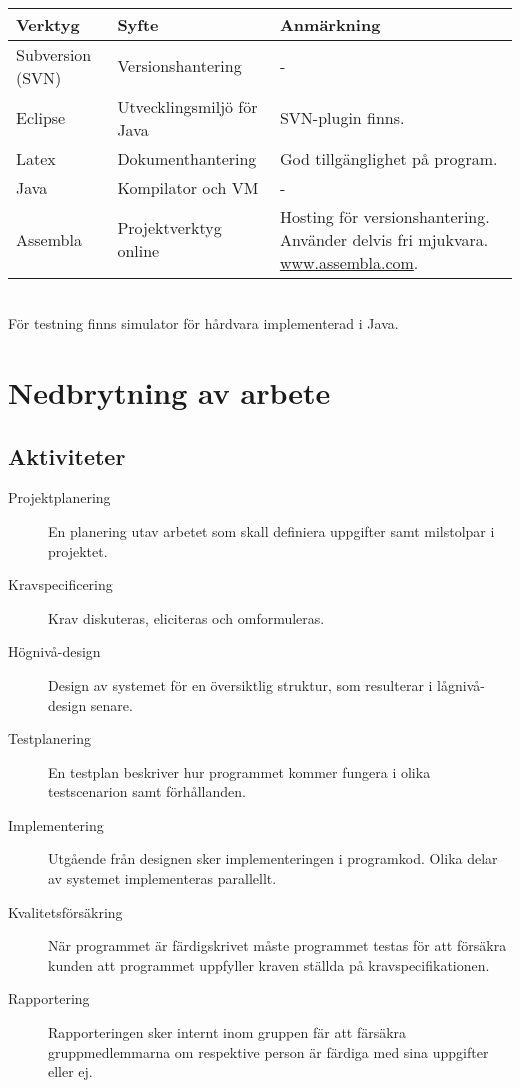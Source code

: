 \documentclass[a4paper]{article}
\begin{document}
\ \\

\begin{tabular}{l|l|p{3.5cm}}
\textbf{Verktyg}		&	\textbf{Syfte}	&	\textbf{Anmärkning} \\
\hline
Subversion (SVN)		 &	 Versionshantering 	&	 - \\
Eclipse		 &	 Utvecklingsmiljö för Java	 &	 SVN-plugin finns. \\
Latex 	&	 Dokumenthantering	 &	 God tillgänglighet på program. \\
Java		 &	 Kompilator och VM 	&	 - \\
Assembla		 &	 Projektverktyg online	 & 		Hosting för versionshantering. Använder delvis fri mjukvara. \url{www.assembla.com}. \\
\end{tabular}

\ \\

För testning finns simulator för hårdvara implementerad i Java.

\section{Nedbrytning av arbete} %
\subsection{Aktiviteter} %

\begin{description}
 \item[Projektplanering] En planering utav arbetet som skall definiera uppgifter samt milstolpar i projektet.
 
 \item[Kravspecificering] Krav diskuteras, eliciteras och omformuleras.

 \item[Högnivå-design] Design av systemet för en översiktlig struktur, som resulterar i lågnivå-design senare.

 \item[Testplanering] En testplan beskriver hur programmet kommer fungera i olika testscenarion samt förhållanden.
 
 \item[Implementering] Utgående från designen sker implementeringen i programkod. Olika delar av systemet implementeras parallellt.

 \item[Kvalitetsförsäkring] När programmet är färdigskrivet måste programmet testas för att försäkra kunden att programmet uppfyller kraven ställda på kravspecifikationen.
 
 \item[Rapportering] Rapporteringen sker internt inom gruppen fär att färsäkra gruppmedlemmarna om respektive person är färdiga med sina uppgifter eller ej.
\end{description}
\end{document}
